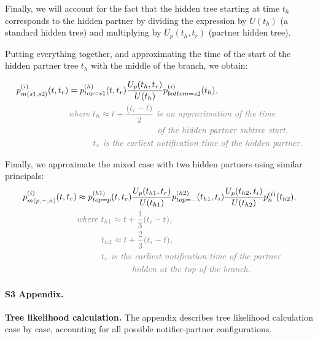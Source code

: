 \documentclass[10pt,letterpaper]{article}
\begin{document}
Finally, we will account for the fact that the hidden tree starting at time $t_h$ corresponds to the hidden partner by dividing the expression by $U(t_h)$ (a standard hidden tree) and multiplying by $U_p(t_h, t_r)$ (partner hidden tree). 

Putting everything together, and approximating the time of the start of the hidden partner tree $t_h$ with the middle of the branch, we obtain: 

\begin{equation}
\begin{split}
p_{m(s1,s2)}^{(i)}(t,t_r) &= p_{top=s1}^{(h)}(t, t_r)\frac{U_p(t_h,t_r)}{U(t_h)}p_{bottom=s2}^{(i)}(t_h)\textit{\color{gray},}\\
&\textit{\color{gray}where $t_{h} \approx t + \frac{(t_i - t)}{2}$ is an approximation of the time}\\
&\textit{\color{gray}~~~~~~~~~~~~~~~~~~~~~~~~~~~~~of the hidden partner subtree start,}\\
&\textit{\color{gray}~~~~~~~~$t_{r}$ is the earliest notification time of the hidden partner.}\\
\end{split}\label{eq:p_mixed}
\end{equation}


Finally, we approximate the mixed case with two hidden partners using similar principals:
\begin{equation}
\begin{split}
p_{m(p,-,n)}^{(i)}(t,t_r) &\approx p_{top=p}^{(h1)}(t, t_r)\frac{U_p(t_{h1},t_{r})}{U(t_{h1})} p_{top=-}^{(h2)}(t_{h1}, t_i)\frac{U_p(t_{h2},t_{i})}{U(t_{h2})} p_n^{(i)}(t_{h2})\textit{\color{gray},}\\
&\textit{\color{gray}where $t_{h1} \approx t + \frac{1}{3}(t_i - t)$,}\\
&\textit{\color{gray}~~~~~~~~$t_{h2} \approx t + \frac{2}{3}(t_i - t)$,}\\
&\textit{\color{gray}~~~~~~~~$t_{r}$ is the earliest notification time of the partner }\\
&\textit{\color{gray}~~~~~~~~~~~~~~~~~~hidden at the top of the branch.}\\
\end{split}\label{eq:p_mixed_mixed}
\end{equation}

\paragraph*{S3 Appendix.}
\label{S3_Appendix}
{\bf Tree likelihood calculation.} The appendix describes tree likelihood calculation case by case, accounting for all possible notifier-partner configurations.
\end{document}
